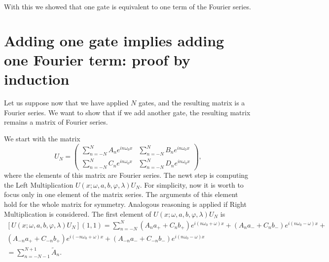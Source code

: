 \documentclass[aps,amssymb,amsmath,amsfonts,pra,superscriptaddress,onecolumn]{revtex4}
\begin{document}
With this we showed that one gate is equivalent to one term of the Fourier series.

\section{Adding one gate implies adding one Fourier term: proof by induction}

Let us suppose now that we have applied $N$ gates, and the resulting matrix is a Fourier series. We want to show that if we add another gate, the resulting matrix remains a matrix of Fourier series. 

We start with the matrix
\begin{equation}
    U_N = \begin{pmatrix}
    \sum_{n = -N}^N A_n e^{i n \omega_0 x} & \sum_{n = -N}^N B_n e^{i n \omega_0 x} \\
    \sum_{n = -N}^N C_n e^{i n \omega_0 x} & \sum_{n = -N}^N D_n e^{i n \omega_0 x}
    \end{pmatrix},
\end{equation}
where the elements of this matrix are Fourier series. The newt step is computing the Left Multiplication $U(x; \omega, a, b, \varphi, \lambda) U_N$. For simplicity, now it is worth to focus only in one element of the matrix series. The arguments of this element hold for the whole matrix for symmetry. Analogous reasoning is applied if Right Multiplication is considered. The first element of $U(x; \omega, a, b, \varphi, \lambda) U_N$ is
\begin{equation}
\begin{split}
  [U(x; \omega, a, b, \varphi, \lambda) U_N] (1,1) =  \sum_{n = -N}^N (A_n a_+ + C_n b_+) e^{i(n\omega_0 + \omega) x} + (A_n a_- + C_n b_-) e^{i(n\omega_0 - \omega) x} + \\
   (A_{-n} a_+ + C_{-n} b_+) e^{i(-n\omega_0 + \omega) x} + (A_{-n} a_- + C_{-n} b_-) e^{i(n\omega_0 - \omega) x} \\
    = \sum_{n = -N - 1}^{N + 1} \tilde{A}_n.
\end{split}
\end{equation}
\end{document}
